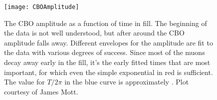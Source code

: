 \begin{figure}[]
    \centering
    \texttt{[image: CBOAmplitude]}
    \caption[CBO amplitude as a function of time]{The CBO amplitude as a function of time in fill. The beginning of the data is not well understood, but after around  the CBO amplitude falls away. Different envelopes for the amplitude are fit to the data with various degrees of success. Since most of the muons decay away early in the fill, it's the early fitted times that are most important, for which even the simple exponential in red is sufficient. The value for $T/2\pi$ in the blue curve is approximately . Plot courtesy of James Mott.}
    \label{fig:CBOAmplitude}
\end{figure}







\cleardoublepage




